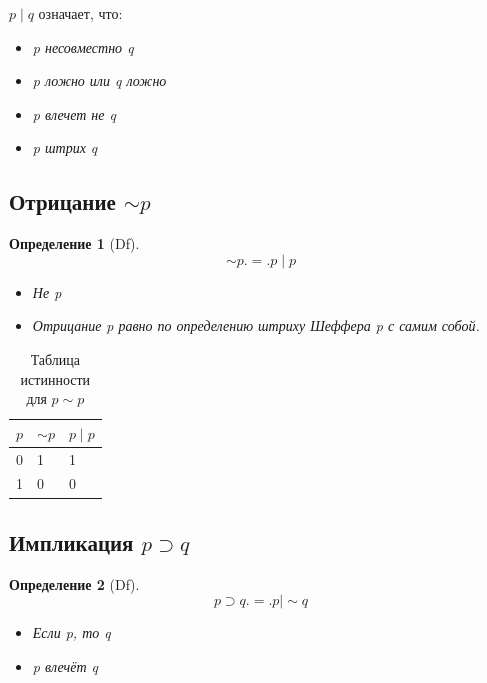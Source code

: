 \documentclass[a4paper, 12pt]{article}
\newtheorem{definition}{Определение}
\begin{document}
$p \mid q$ означает, что:
\begin{itemize} 
 \item \textit{p несовместно q}
 \item \textit{p ложно или q ложно}
 \item \textit{p влечет не q} 
 \item \textit{p штрих q} 
\end{itemize}

%

\subsection{Отрицание $\sim p$}
\begin{definition}[Df]
    \[
       \sim p.=.p \mid p 
    \]
\end{definition}

\begin{itemize} 
 \item \textit{Не p}
 \item \textit{Отрицание p равно по определению штриху Шеффера p с самим собой.}
\end{itemize}

\begin{table}[h]
    \centering
    \caption{Таблица истинности для $p \sim p $}
    \label{tab:equalwidth}
    \begin{tabularx}{\textwidth}{|X|X|X|}
        \hline
        \textbf{$p$} & \textbf{$\sim p$} & \textbf{$p \mid p$}\\
        \hline
        0 & 1 & 1 \\
        \hline
        1 & 0 & 0 \\
        \hline
    \end{tabularx}
\end{table}

\subsection{Импликация $p \supset q$}

\begin{definition}[Df]
    \[
       p \supset q .=. p \mid \sim q 
    \]
\end{definition}

\begin{itemize} 
 \item \textit{Если p, то q}
 \item \textit{p влечёт q}
\end{itemize}
 
\end{document}
